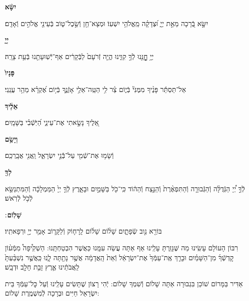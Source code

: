 \documentclass[twoside, openany, parskip=half, 11pt]{book}
\begin{document}
\textbf{יִשָּׂ֨א}
\hfill \begin{footnotesize}
	יִשָּׂ֣א בְֿ֭רָכָה מֵאֵ֣ת יְיָ֑ וּ֝צְדָקָ֗ה מֵֽאֱלֹהֵ֥י יִשְׁעֽוֹ׃ וּמְצָא־חֵ֖ן וְֿשֵׂ֣כֶל־ט֑וֹב בְּֿעֵינֵ֖י אֱלֹהִ֣ים וְֿאָדָֽם׃\\
\end{footnotesize}
\textbf{יְיָ֤}
\hfill \begin{footnotesize}
	יְיָ֥ חׇׇׇׇׇׇׇׇָנֵּ֖נוּ לְֿךָ֣ קִוִּ֑ינוּ הֱיֵ֤ה זְֿרֹעָם֙ לַבְּֿקָרִ֔ים אַף־יְֿשֽׁוּעָתֵ֖נוּ בְּֿעֵ֥ת צָרָֽה׃\\
\end{footnotesize}
\textbf{פָּנָיו֙}
\hfill \begin{footnotesize}
	אַל־תַּסְתֵּ֬ר פָּנֶ֨יךָ מִמֶּנִּי֘ בְּֿי֢וֹם צַ֫ר לִ֥י הַטֵּֽה־אֵלַ֥י אָזְֿנֶ֑ךָ
	בְּֿי֥וֹם אֶ֝קְרָ֗א מַהֵ֥ר עֲנֵֽנִי׃\\
\end{footnotesize}
\textbf{אֵלֶ֔יךָ}
\hfill \begin{footnotesize}
	אֵ֭לֶיךָ נָשָׂ֣אתִי אֶת־עֵינַ֑י הַ֝יֹּֽשְֿׁבִ֗י בַּשָּׁמָֽיִם׃\\
\end{footnotesize}
\textbf{וְיָשֵׂ֥ם}
\hfill \begin{footnotesize}
	וְֿשָׂמ֥וּ אֶת־שְֿׁמִ֖י עַל־בְּֿֿנֵ֣י יִשְׂרָאֵ֑ל וַֽאֲנִ֖י אֲבָֽרְכֵֽם׃\\
\end{footnotesize}
\textbf{לְךָ֖}
\hfill \begin{footnotesize}
	לְֿךָ֣ יְ֠יָ הַגְּֿדֻלָּ֨ה וְֿהַגְּֿבוּרָ֤ה וְֿהַתִּפְאֶ֨רֶת֙ וְֿהַנֵּ֣צַח וְֿהַה֔וֹד
	כִּֽי־כֹ֖ל בַּשָּׁמַ֣יִם וּבָאָ֑רֶץ לְֿךָ֤ יְיָ֙ הַמַּמְלָכָ֔ה וְֿהַמִּתְנַשֵּׂ֖א
	לְֿכֹ֥ל לְֿרֹֽאשׁ׃\\
\end{footnotesize}
\textbf{שָׁלֽוֹם}
׃ \hfill \begin{footnotesize}
	בּוֹרֵ֖א נִ֣וב שְֿׂפָתָ֑יִם שָׁל֨וֹם שָׁל֜וֹם לָֽרָח֧וֹק וְֿלַקָּר֛וֹב
	אָמַ֥ר יְיָ֖ וּרְפָאתִֽיו׃
\end{footnotesize}

\clearpage

\begin{paracol}{2}
	רִבּוֹן הָעוֹלָם עָשִֽׂינוּ מַה שֶּׁגָּזַֽרְתָּ עָלֵֽינוּ אַף אַתָּה עֲשֵׂה עִמָּֽנוּ כַּאֲשֶׁר הִבְטַחְתָּֽנוּ: הַשְׁקִ֩יפָה֩ מִמְּֿע֨וֹן קׇדְשְֿׁךָ֜ מִן־הַשָּׁמַ֗יִם וּבָרֵ֤ךְ אֶֽת־עַמְּֿךָ֙ אֶת־יִשְׂרָאֵ֔ל וְֿאֵת֙ הָֽאֲדָמָ֔ה אֲשֶׁ֥ר נָתַ֖תָּה לָ֑נוּ כַּֽאֲשֶׁ֤ר נִשְׁבַּ֨עְתָּ֙ לַֽאֲבֹתֵ֔ינוּ אֶ֛רֶץ זָבַ֥ת חָלָ֖ב וּדְבָֽשׁ׃
	
	\switchcolumn
	
	\kahal
	אַדִּיר בַּמָּרוֹם שׁוֹכֵן בִּגְבוּרָה אַתָּה שָׁלוֹם וְֿשִׁמְךָ שָׁלוֹם: יְֿהִי רָצוֹן שֶׁתָּשִׂים עָלֵֽינוּ וְֿעַל כׇּל־עַמְּֿךָ בֵּית יִשְׂרָאֵל חַיִּים וּבְרָכָה לְֿמִשְׁמֶֽרֶת שָׁלוֹם:
\end{paracol}
\end{document}
